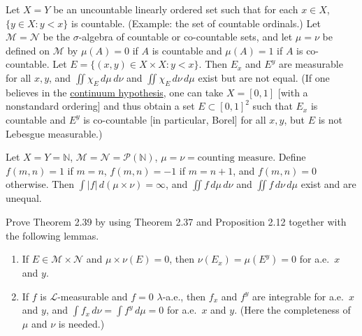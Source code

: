 	\begin{exercise}[Folland 2.47]
		Let $X = Y$ be an uncountable linearly ordered set such that for each $x \in X$, $\{y \in X : y < x\}$ is countable. (Example: the set of countable ordinals.) Let $\mathcal{M} = \mathcal{N}$ be the $\sigma$-algebra of countable or co-countable sets, and let $\mu = \nu$ be defined on $\mathcal{M}$ by $\mu(A) = 0$ if $A$ is countable and $\mu(A) = 1$ if $A$ is co-countable. Let $E = \{(x, y) \in X \times X : y < x\}$. Then $E_x$ and $E^y$ are measurable for all $x, y$, and $\iint \chi_E \, d\mu \, d\nu$ and $\iint \chi_E \, d\nu \, d\mu$ exist but are not equal. (If one believes in the \hyperref[st-thm:continuum-hypothesis]{continuum hypothesis}, one can take $X = [0, 1]$ [with a nonstandard ordering] and thus obtain a set $E \subset [0, 1]^2$ such that $E_x$ is countable and $E^y$ is co-countable [in particular, Borel] for all $x, y$, but $E$ is not Lebesgue measurable.)
	\end{exercise}
	\begin{solution}

	\end{solution}

	\begin{exercise}[Folland 2.48]
		Let $X = Y = \mathbb{N}$, $\mathcal{M} = \mathcal{N} = \mathcal{P}(\mathbb{N})$, $\mu = \nu = \text{counting measure}$. Define $f(m, n) = 1$ if $m = n$, $f(m, n) = -1$ if $m = n + 1$, and $f(m, n) = 0$ otherwise. Then $\int |f| \, d(\mu \times \nu) = \infty$, and $\iint f \, d\mu \, d\nu$ and $\iint f \, d\nu \, d\mu$ exist and are unequal.
	\end{exercise}
	\begin{solution}

	\end{solution}

	\begin{exercise}[Folland 2.49]
		Prove Theorem 2.39 by using Theorem 2.37 and Proposition 2.12 together with the following lemmas.
		\begin{enumerate}[label=\textbf{\alph*.}]
			\item If $E \in \mathcal{M} \times \mathcal{N}$ and $\mu \times \nu(E) = 0$, then $\nu(E_x) = \mu(E^y) = 0$ for a.e.\ $x$ and $y$.
			\item If $f$ is $\mathcal{L}$-measurable and $f = 0$ $\lambda$-a.e., then $f_x$ and $f^y$ are integrable for a.e.\ $x$ and $y$, and $\int f_x \, d\nu = \int f^y \, d\mu = 0$ for a.e.\ $x$ and $y$. (Here the completeness of $\mu$ and $\nu$ is needed.)
		\end{enumerate}
	\end{exercise}
	\begin{solution}

	\end{solution}

